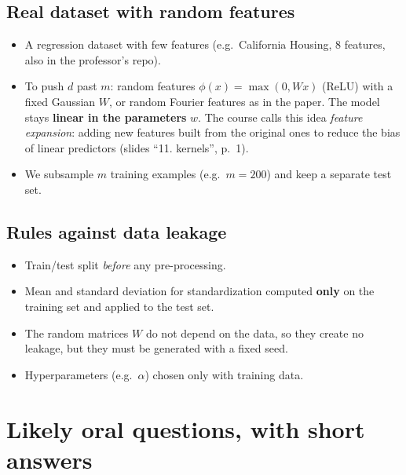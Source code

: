 \documentclass[11pt,a4paper]{article}
\begin{document}
\subsection{Real dataset with random features}
\begin{itemize}
  \item A regression dataset with few features (e.g.\ California Housing, 8 features, also in the professor's repo).
  \item To push $d$ past $m$: random features $\phi(x) = \max(0, Wx)$ (ReLU) with a fixed Gaussian $W$, or random
        Fourier features as in the paper. The model stays \textbf{linear in the parameters} $w$.
        The course calls this idea \emph{feature expansion}: adding new features built from the original ones to reduce
        the bias of linear predictors (slides ``11. kernels'', p.~1).
  \item We subsample $m$ training examples (e.g.\ $m = 200$) and keep a separate test set.
\end{itemize}

\subsection{Rules against data leakage}
\begin{itemize}
  \item Train/test split \emph{before} any pre-processing.
  \item Mean and standard deviation for standardization computed \textbf{only} on the training set and applied to the test set.
  \item The random matrices $W$ do not depend on the data, so they create no leakage, but they must be generated with a fixed seed.
  \item Hyperparameters (e.g.\ $\alpha$) chosen only with training data.
\end{itemize}

\section{Likely oral questions, with short answers}
\end{document}
